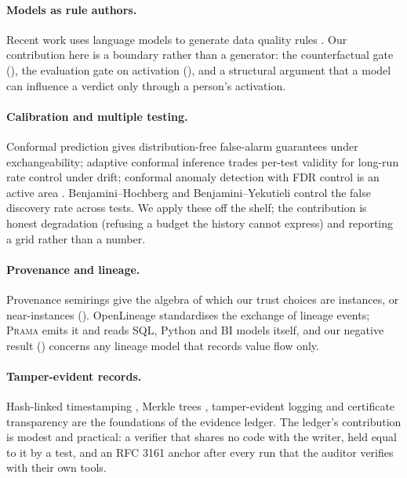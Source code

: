 \documentclass[11pt,a4paper]{article}
\renewcommand{\_}{\oldunderscore\allowbreak}
\theoremstyle{plain}
\theoremstyle{definition}
\theoremstyle{remark}
\begin{document}
\paragraph{Models as rule authors.} Recent work uses language models to generate data quality rules
\cite{llmdqr,llmtabular,tuwien}. Our contribution here is a boundary rather than a generator: the
counterfactual gate (), the evaluation gate on activation (), and a
structural argument that a model can influence a verdict only through a person's activation.

\paragraph{Calibration and multiple testing.} Conformal prediction \cite{vovk2005} gives distribution-free
false-alarm guarantees under exchangeability; adaptive conformal inference \cite{gibbs2021} trades per-test
validity for long-run rate control under drift; conformal anomaly detection with FDR control is an active
area \cite{fdrnovelty,nonconform}. Benjamini--Hochberg \cite{bh1995} and Benjamini--Yekutieli \cite{by2001}
control the false discovery rate across tests. We apply these off the shelf; the contribution is honest
degradation (refusing a budget the history cannot express) and reporting a grid rather than a number.

\paragraph{Provenance and lineage.} Provenance semirings \cite{green2007} give the algebra of which our trust
choices are instances, or near-instances (). OpenLineage \cite{openlineage} standardises the
exchange of lineage events; \textsc{Prama} emits it and reads SQL, Python and BI models itself, and our
negative result () concerns any lineage model that records value flow only.

\paragraph{Tamper-evident records.} Hash-linked timestamping \cite{haber1991}, Merkle trees \cite{merkle1987},
tamper-evident logging \cite{crosby2009} and certificate transparency \cite{laurie2013} are the foundations of
the evidence ledger. The ledger's contribution is modest and practical: a verifier that shares no code with the
writer, held equal to it by a test, and an RFC 3161 anchor after every run that the auditor verifies with
their own tools.
\end{document}
